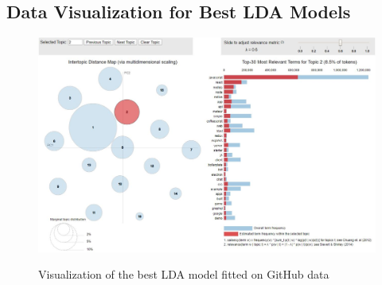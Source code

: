             \begin{table}
                \centering
              \caption{Parameters of Models from Experiment 2B - Expertise Extraction from Stack Overflow Data} \label{tab:SO_params2}
                \vspace{6pt} %
            \end{table}
            
            
        \subsection{Data Visualization for Best LDA Models\label{pyldaviz}}
            \begin{figure}
              \centering
              \includegraphics[width=\textwidth]{figures/pyLDAviz_GH.JPG}\\
              \caption{Visualization of the best LDA model fitted on GitHub data}
              \label{fig:pyldaviz_GH}
            \end{figure}
            
